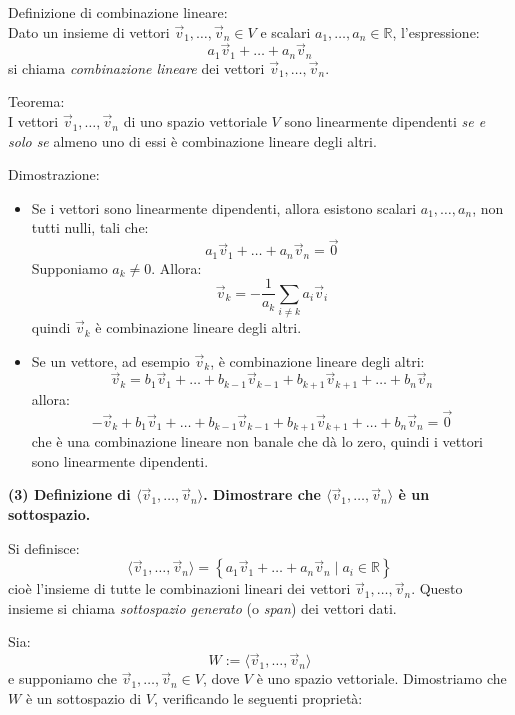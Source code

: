 \documentclass[10pt]{extarticle}
\begin{document}
Definizione di combinazione lineare: \\
Dato un insieme di vettori $\vec{v}_1, \dots, \vec{v}_n \in V$ e scalari $a_1, \dots, a_n \in \mathbb{R}$, l'espressione:
\[
a_1 \vec{v}_1 + \dots + a_n \vec{v}_n
\]
si chiama \emph{combinazione lineare} dei vettori $\vec{v}_1, \dots, \vec{v}_n$.

Teorema: \\
I vettori $\vec{v}_1, \dots, \vec{v}_n$ di uno spazio vettoriale $V$ sono linearmente dipendenti \emph{se e solo se} almeno uno di essi è combinazione lineare degli altri.

Dimostrazione:
\begin{itemize}
    \item[$\Rightarrow$] Se i vettori sono linearmente dipendenti, allora esistono scalari $a_1, \dots, a_n$, non tutti nulli, tali che:
    \[
    a_1 \vec{v}_1 + \dots + a_n \vec{v}_n = \vec{0}
    \]
    Supponiamo $a_k \neq 0$. Allora:
    \[
    \vec{v}_k = -\frac{1}{a_k} \sum_{i \neq k} a_i \vec{v}_i
    \]
    quindi $\vec{v}_k$ è combinazione lineare degli altri.

    \item[$\Leftarrow$] Se un vettore, ad esempio $\vec{v}_k$, è combinazione lineare degli altri:
    \[
    \vec{v}_k = b_1 \vec{v}_1 + \dots + b_{k-1} \vec{v}_{k-1} + b_{k+1} \vec{v}_{k+1} + \dots + b_n \vec{v}_n
    \]
    allora:
    \[
    -\vec{v}_k + b_1 \vec{v}_1 + \dots + b_{k-1} \vec{v}_{k-1} + b_{k+1} \vec{v}_{k+1} + \dots + b_n \vec{v}_n = \vec{0}
    \]
    che è una combinazione lineare non banale che dà lo zero, quindi i vettori sono linearmente dipendenti.
\end{itemize}
\vspace{1em} 
\textbf{(3) Definizione di $\langle \vec{v}_1, \dots, \vec{v}_n \rangle$. Dimostrare che $\langle \vec{v}_1, \dots, \vec{v}_n \rangle$ è un sottospazio.}

Si definisce:
\[
\langle \vec{v}_1, \dots, \vec{v}_n \rangle = \left\{ a_1 \vec{v}_1 + \dots + a_n \vec{v}_n \mid a_i \in \mathbb{R} \right\}
\]
cioè l'insieme di tutte le combinazioni lineari dei vettori $\vec{v}_1, \dots, \vec{v}_n$. Questo insieme si chiama \emph{sottospazio generato} (o \emph{span}) dei vettori dati.

Sia:
\[
W := \langle \vec{v}_1, \dots, \vec{v}_n \rangle
\]
e supponiamo che $\vec{v}_1, \dots, \vec{v}_n \in V$, dove $V$ è uno spazio vettoriale. Dimostriamo che $W$ è un sottospazio di $V$, verificando le seguenti proprietà:
\end{document}
